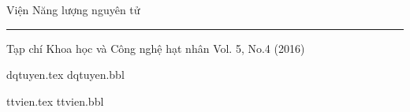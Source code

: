 \documentclass[11pt, a4paper, bold, center, twoside, noheadline, journal]{paper}%
\newcommand{\clearHeading}{%
	\clearpage
	\thispagestyle{empty}	
	\cleardoublepage      
}
\begin{document}
\renewcommand{\contentsname}{Danh sách các bài báo}%
\renewcommand{\abstractname}{Tóm tắt}%
\renewcommand{\keywordname}{\textbf{Từ khóa}}%
\renewcommand{\figureshortname}{Hình}%
\renewcommand{\tableshortname}{Bảng}%
\renewcommand{\refname}{Tài liệu tham khảo}%

\begin{titlepage} %
	\begin{center}
		\bfseries
		{\Large Viện Năng lượng nguyên tử\\
		\rule{0.6\textwidth}{1.pt}} 
		\vfill
		{\Huge Tạp chí Khoa học và Công nghệ hạt nhân} 
		\vfill
		{\large Vol. 5, No.4 (2016)}
\end{center} 
\clearHeading
\end{titlepage}%


\thispagestyle{plain}%
\journalcontents
\clearHeading

{dqtuyen.tex}%
{dqtuyen.bbl}
\clearHeading

{ttvien.tex}
{ttvien.bbl}%
\clearHeading
\end{document}
